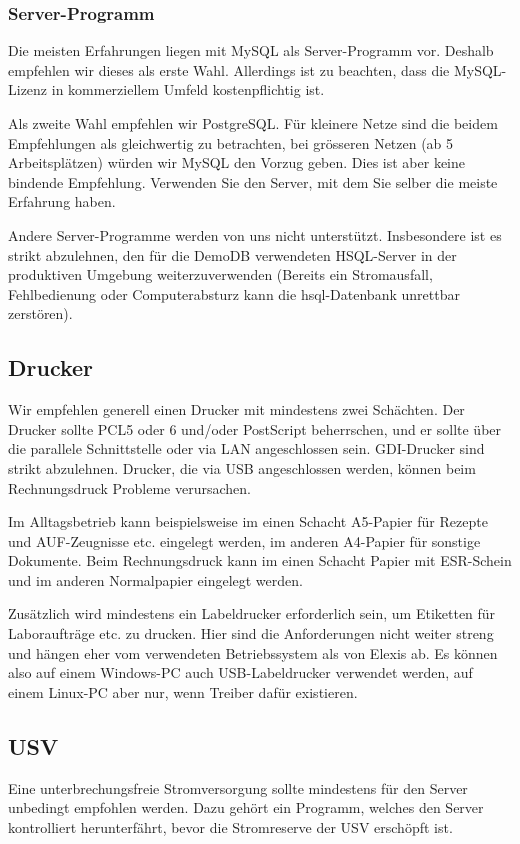 \documentclass[paper=a4,BCOR8.25mm,twoside]{scrartcl}
\begin{document}
\subsubsection{Server-Programm}
Die meisten Erfahrungen liegen mit MySQL als Server-Programm vor. Deshalb empfehlen wir dieses als erste Wahl. Allerdings ist zu beachten, dass die MySQL-Lizenz in kommerziellem Umfeld kostenpflichtig ist.

Als zweite Wahl empfehlen wir PostgreSQL. Für kleinere Netze sind die beidem Empfehlungen als gleichwertig zu betrachten, bei grösseren Netzen (ab 5 Arbeitsplätzen) würden wir MySQL den Vorzug geben. Dies ist aber keine bindende Empfehlung. Verwenden Sie den Server, mit dem Sie selber die meiste Erfahrung haben.

Andere Server-Programme werden von uns nicht unterstützt.
Insbesondere ist es strikt abzulehnen, den für die DemoDB verwendeten HSQL-Server in der produktiven Umgebung weiterzuverwenden (Bereits ein Stromausfall, Fehlbedienung oder Computerabsturz kann die hsql-Datenbank unrettbar zerstören).

\subsection{Drucker}
Wir empfehlen generell einen Drucker mit mindestens zwei Schächten. Der Drucker sollte PCL5 oder 6 und/oder PostScript beherrschen, und er sollte über die parallele Schnittstelle oder via LAN angeschlossen sein. GDI-Drucker sind strikt abzulehnen. Drucker, die via USB angeschlossen werden, können beim Rechnungsdruck Probleme verursachen.

Im Alltagsbetrieb kann beispielsweise im einen Schacht A5-Papier für Rezepte und AUF-Zeugnisse etc. eingelegt werden, im anderen A4-Papier für sonstige Dokumente. Beim Rechnungsdruck kann im einen Schacht Papier mit ESR-Schein und im anderen Normalpapier eingelegt werden.

\bigskip

Zusätzlich wird mindestens ein Labeldrucker erforderlich sein, um Etiketten für Laboraufträge etc. zu drucken. Hier sind die Anforderungen nicht weiter streng und hängen eher vom verwendeten Betriebssystem als von Elexis ab. Es können also auf einem Windows-PC auch USB-Labeldrucker verwendet werden, auf einem Linux-PC aber nur, wenn Treiber dafür existieren.

\subsection{USV}
Eine unterbrechungsfreie Stromversorgung sollte mindestens für den Server unbedingt empfohlen werden. Dazu gehört ein Programm, welches den Server kontrolliert herunterfährt, bevor die Stromreserve der USV erschöpft ist.
\end{document}
